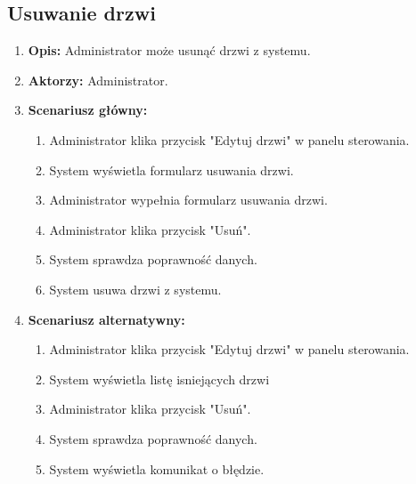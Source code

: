 \subsection{Usuwanie drzwi}
\begin{enumerate}
    \item \textbf{Opis:} Administrator może usunąć drzwi z systemu.
    \item \textbf{Aktorzy:} Administrator.
    \item \textbf{Scenariusz główny:} 
    \begin{enumerate}
        \item Administrator klika przycisk "Edytuj drzwi" w panelu sterowania.
        \item System wyświetla formularz usuwania drzwi.
        \item Administrator wypełnia formularz usuwania drzwi.
        \item Administrator klika przycisk "Usuń".
        \item System sprawdza poprawność danych.
        \item System usuwa drzwi z systemu.
    \end{enumerate}
    \item \textbf{Scenariusz alternatywny:} 
    \begin{enumerate}
        \item Administrator klika przycisk "Edytuj drzwi" w panelu sterowania.
        \item System wyświetla listę isniejących drzwi
        \item Administrator klika przycisk "Usuń".
        \item System sprawdza poprawność danych.
        \item System wyświetla komunikat o błędzie.
    \end{enumerate}
\end{enumerate}


